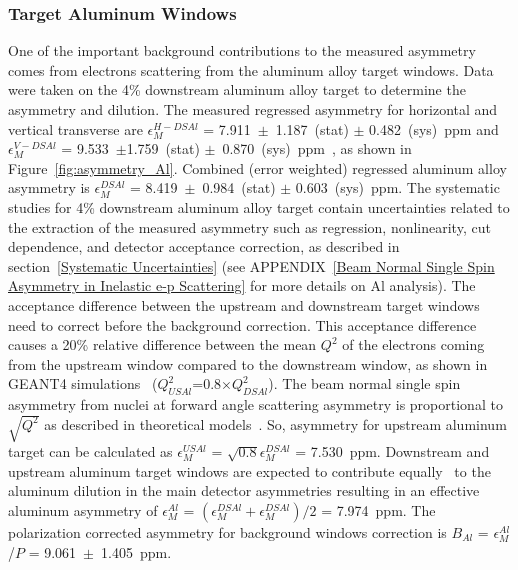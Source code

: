 \subsubsection{Target Aluminum Windows}
\label{Target Aluminum Windows}
One of the important background contributions to the measured asymmetry comes from electrons scattering from the aluminum alloy target windows. 
Data were taken on the 4\% downstream aluminum alloy target to determine the asymmetry and dilution.
The measured regressed asymmetry for horizontal and vertical transverse are $\epsilon^{H-DSAl}_{M}$ = 7.911~$\pm$~1.187~(stat) $\pm$ 0.482~(sys)~ppm and $\epsilon^{V-DSAl}_{M}$ = 9.533~$\pm$1.759~(stat) $\pm$~0.870~(sys)~ppm~\cite{elog:nur_ancillary43}, as shown in Figure~\ref{fig:asymmetry_Al}. Combined (error weighted) regressed aluminum alloy asymmetry is $\epsilon^{DSAl}_{M}$ = 8.419~$\pm$~0.984~(stat) $\pm$ 0.603~(sys)~ppm. 
The systematic studies for 4\% downstream aluminum alloy target contain uncertainties related to the extraction of the measured asymmetry such as regression, nonlinearity, cut dependence, and detector acceptance correction, as described in section~\ref{Systematic Uncertainties} (see APPENDIX~\ref{Beam Normal Single Spin Asymmetry in Inelastic e-p Scattering} for more details on Al analysis).
The acceptance difference between the upstream and downstream target windows need to correct before the background correction. This acceptance difference causes a 20\% relative difference between the mean $Q^{2}$ of the electrons coming from the upstream window compared to the downstream window, as shown in GEANT4 simulations~\cite{kmyers_qweak} ($Q^{2}_{USAl}$=0.8$\times Q^{2}_{DSAl}$). The beam normal single spin asymmetry from nuclei at forward angle scattering asymmetry is proportional to $\sqrt{Q^{2}}$ as described in theoretical models~\cite{PhysRevC.72.034602, PhysRevC.77.044606}. So, asymmetry for upstream aluminum target can be calculated as $\epsilon^{USAl}_{M}$ = $\sqrt{0.8} \epsilon^{DSAl}_{M}$ = 7.530~ppm. Downstream and upstream aluminum target windows are expected to contribute equally~\cite{kmyers_qweak} to the aluminum dilution in the main detector asymmetries resulting in an effective aluminum asymmetry of $\epsilon^{Al}_{M}$ = $(\epsilon^{DSAl}_{M}+\epsilon^{DSAl}_{M})/2$ = 7.974~ppm. 
The polarization corrected asymmetry for background windows correction is $B_{Al}$ = $\epsilon^{Al}_{M}$/$P$ = 9.061~$\pm$~1.405~ppm.

